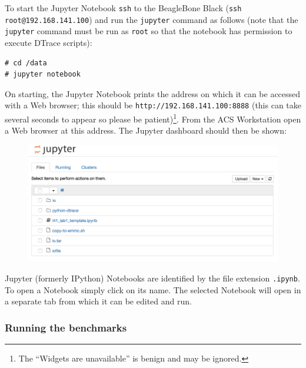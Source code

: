 \documentclass[a4paper,10pt]{article}
\newcommand{\code}[1]{\texttt{\small #1}}
\begin{document}
To start the Jupyter Notebook \code{ssh} to the BeagleBone Black (\code{ssh
root@192.168.141.100}) and run the \code{jupyter} command as follows (note
that the \code{jupyter} command must be run as \code{root} so that the notebook
 has permission to execute DTrace scripts):

\begin{small}
\begin{verbatim}
# cd /data
# jupyter notebook
\end{verbatim}
\end{small}

On starting, the Jupyter Notebook prints the address on which it can be
accessed with a Web browser; this should be
\texttt{http://192.168.141.100:8888} (this can take several seconds to
appear so please be patient)\footnote{The ``Widgets are unavailable'' is
benign and may be ignored.}.  From the ACS Workstation open a Web browser
at this address.  The Jupyter dashboard should then be shown:

\begin{figure}[H]
\includegraphics[width=\linewidth]{jupyter_home.png}
\end{figure}

Jupyter (formerly IPython) Notebooks are identified by the file extension
\code{.ipynb}. To open a Notebook simply click on its name. The selected
Notebook will open in a separate tab from which it can be edited and run.

\subsubsection*{Running the benchmarks}
\end{document}
